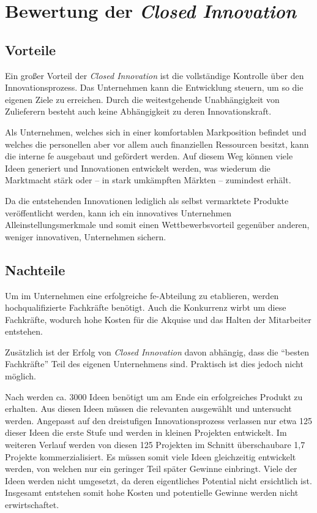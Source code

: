 \section{Bewertung der \textit{Closed Innovation}}\label{sec:bewertung}


\subsection{Vorteile}\label{sec:bewertung-vor}
Ein großer Vorteil der \textit{Closed Innovation} ist die vollständige Kontrolle über den Innovationsprozess.
Das Unternehmen kann die Entwicklung steuern,
um so die eigenen Ziele zu erreichen.
Durch die weitestgehende Unabhängigkeit von Zulieferern besteht auch keine Abhängigkeit zu deren Innovationskraft.

Als Unternehmen, welches sich in einer komfortablen Markposition befindet
und welches die personellen aber vor allem auch finanziellen Ressourcen besitzt,
kann die interne \ac{fe} ausgebaut und gefördert werden.
Auf diesem Weg können viele Ideen generiert und Innovationen entwickelt werden,
was wiederum die Marktmacht stärk oder -- in stark umkämpften Märkten -- zumindest erhält.

Da die entstehenden Innovationen lediglich als selbst vermarktete Produkte veröffentlicht werden,
kann ich ein innovatives Unternehmen Alleinstellungsmerkmale und somit einen Wettbewerbsvorteil gegenüber anderen,
weniger innovativen, Unternehmen sichern.

\subsection{Nachteile}\label{sec:bewertung-nach}
Um im Unternehmen eine erfolgreiche \ac{fe}-Abteilung zu etablieren,
werden hochqualifizierte Fachkräfte benötigt.
Auch die Konkurrenz wirbt um diese Fachkräfte,
wodurch hohe Kosten für die Akquise und das Halten der Mitarbeiter entstehen.

Zusätzlich ist der Erfolg von \textit{Closed Innovation} davon abhängig,
dass die \enquote{besten Fachkräfte} Teil des eigenen Unternehmens sind.
Praktisch ist dies jedoch nicht möglich.

Nach \cite{stevens19973} werden ca. 3000 Ideen benötigt um am Ende ein erfolgreiches Produkt zu erhalten.
Aus diesen Ideen müssen die relevanten ausgewählt und untersucht werden.
Angepasst auf den dreistufigen Innovationsprozess verlassen nur etwa 125 dieser Ideen die erste Stufe
und werden in kleinen Projekten entwickelt.
Im weiteren Verlauf werden von diesen 125 Projekten im Schnitt überschaubare 1,7 Projekte kommerzialisiert.
Es müssen somit viele Ideen gleichzeitig entwickelt werden,
von welchen nur ein geringer Teil später Gewinne einbringt.
Viele der Ideen werden nicht umgesetzt, da deren eigentliches Potential nicht ersichtlich ist.
Insgesamt entstehen somit hohe Kosten und potentielle Gewinne werden nicht erwirtschaftet.

